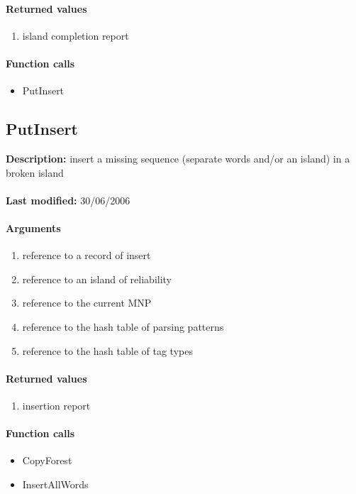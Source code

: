 \paragraph{Returned values}
\begin{enumerate}
\item island completion report
\end{enumerate}

\paragraph{Function calls}
\begin{itemize}
\item PutInsert
\end{itemize}

\subsection{PutInsert}
\textbf{Description:} insert a missing sequence (separate words and/or an island) in a broken island\\
\\\textbf{Last modified:} 30/06/2006

\paragraph{Arguments}
\begin{enumerate}
\item reference to a record of insert
\item reference to an island of reliability
\item reference to the current MNP
\item reference to the hash table of parsing patterns
\item reference to the hash table of tag types
\end{enumerate}

\paragraph{Returned values}
\begin{enumerate}
\item insertion report
\end{enumerate}

\paragraph{Function calls}
\begin{itemize}
\item CopyForest
\item InsertAllWords
\end{itemize}

